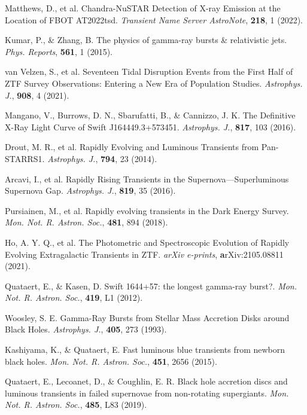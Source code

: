 \documentclass{nature_plusfigure}
\newcommand{\mn}{{Mon. Not. R. Astron. Soc.}}
\newcommand{\physrep}{{Phys. Reports}}
\newcommand{\mnras}{\mn}
\newcommand{\apj}{{Astrophys. J.}}
\begin{document}
\begin{thebibliography}{100}
 Matthews, D., et al. Chandra-NuSTAR Detection of X-ray Emission at the Location of FBOT AT2022tsd. \emph{Transient Name Server AstroNote}, \textbf{218}, 1 (2022). 


 Kumar, P., \& Zhang, B. The physics of gamma-ray bursts \& relativistic jets. \emph{\physrep}, \textbf{561}, 1 (2015). 

 van Velzen, S., et al. Seventeen Tidal Disruption Events from the First Half of ZTF Survey Observations: Entering a New Era of Population Studies. \emph{\apj}, \textbf{908}, 4 (2021). 

 Mangano, V., Burrows, D. N., Sbarufatti, B., \& Cannizzo, J. K. The Definitive X-Ray Light Curve of Swift J164449.3+573451. \emph{\apj}, \textbf{817}, 103 (2016). 


 Drout, M. R., et al. Rapidly Evolving and Luminous Transients from Pan-STARRS1. \emph{\apj}, \textbf{794}, 23 (2014). 

 Arcavi, I., et al. Rapidly Rising Transients in the Supernova—Superluminous Supernova Gap. \emph{\apj}, \textbf{819}, 35 (2016). 

 Pursiainen, M., et al. Rapidly evolving transients in the Dark Energy Survey. \emph{\mnras}, \textbf{481}, 894 (2018). 

 Ho, A. Y. Q., et al. The Photometric and Spectroscopic Evolution of Rapidly Evolving Extragalactic Transients in ZTF. \emph{arXiv e-prints}, \textbf arXiv:2105.08811 (2021). 


 Quataert, E., \& Kasen, D. Swift 1644+57: the longest gamma-ray burst?. \emph{\mnras}, \textbf{419}, L1 (2012). 

 Woosley, S. E. Gamma-Ray Bursts from Stellar Mass Accretion Disks around Black Holes. \emph{\apj}, \textbf{405}, 273 (1993). 

 Kashiyama, K., \& Quataert, E. Fast luminous blue transients from newborn black holes. \emph{\mnras}, \textbf{451}, 2656 (2015). 

  Quataert, E., Lecoanet, D., \& Coughlin, E. R. Black hole accretion discs and luminous transients in failed supernovae from non-rotating supergiants. \emph{\mnras}, \textbf{485}, L83 (2019). 


\end{thebibliography}
\end{document}
